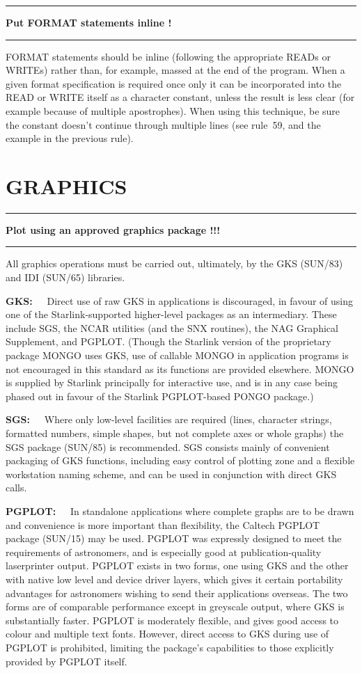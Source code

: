 \documentclass[twoside,11pt,nolof,noabs]{starlink}
\newcounter{sruleno}
\providecommand{\srule}[1]{
    \addtocounter{sruleno}{1}
    \goodbreak
    \rule{\textwidth}{0.3mm}
    \textbf{#1} \scpushright{ \textbf{\thesruleno}}
    \rule{\textwidth}{0.1mm}
}
\renewcommand{\_}{{\tt\char'137}}
\begin{document}
\srule{Put FORMAT statements inline !}
FORMAT statements should be inline (following the appropriate READs or WRITEs)
rather than, for example, massed at the end of the program.
When a given format
specification is required once only it can be incorporated into the READ
or WRITE itself as a character
constant, unless the result is less clear (for example because of
multiple apostrophes).  When using this technique, be sure
the constant doesn't continue through multiple lines (see rule~59,
and the example in the previous rule).

\newpage
\section{GRAPHICS}

\srule{Plot using an approved graphics package !!!}
All graphics operations must be carried out, ultimately,
by the GKS (SUN/83) and IDI (SUN/65) libraries.

\textbf{GKS:~~} Direct use of raw GKS in applications is
discouraged, in favour of using one
of the Starlink-supported higher-level packages as an intermediary.
These include SGS, the \mbox{NCAR} utilities (and the SNX routines),
the NAG Graphical Supplement, and \mbox{PGPLOT}.  (Though the Starlink
version of the proprietary package MONGO uses GKS, use of
callable MONGO in application
programs is not encouraged in this standard as its functions
are provided elsewhere.  MONGO is supplied by Starlink principally
for interactive use, and is in any case being phased out in favour
of the Starlink \mbox{PGPLOT}-based PONGO package.)

\textbf{SGS:~~} Where only low-level facilities are required (lines,
character strings, formatted numbers, simple shapes, but
not complete axes or whole graphs) the SGS package (SUN/85)
is recommended.  SGS consists mainly of convenient packaging
of GKS functions, including easy control of plotting zone
and a flexible workstation naming scheme, and can be used
in conjunction with direct GKS calls.

\textbf{PGPLOT:~~} In standalone applications where complete graphs are to be
drawn and convenience is more important than flexibility,
the Caltech \mbox{PGPLOT} package (SUN/15) may be used.
\mbox{PGPLOT} was expressly designed to meet the requirements of
astronomers, and is especially
good at publication-quality laserprinter output.
\mbox{PGPLOT} exists in two forms, one using GKS and the other
with native low level and device driver layers, which gives
it certain portability advantages for astronomers
wishing to send their applications overseas.
The two forms are of comparable performance except in greyscale output,
where GKS is substantially faster.
\mbox{PGPLOT} is moderately flexible,
and gives good access to colour and multiple text fonts.
However, direct access to GKS during use of \mbox{PGPLOT}
is prohibited, limiting the package's capabilities
to those explicitly provided by \mbox{PGPLOT} itself.
\end{document}

